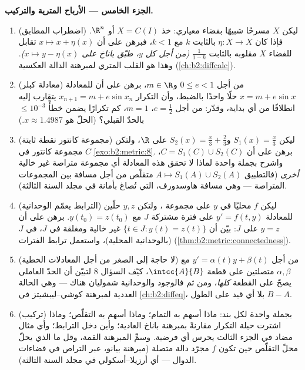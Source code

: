 \begin{problem}
\medskip
\noindent\textbf{الجزء الخامس --- الأرباح المترية والتركيب.}
\begin{enumerate}[resume]
  \item (اضطراب المطابق) ليكن $X$ مسرحًا 
        شبيهًا بفضاء معياري: خذ $X = C(I)$ أو $\R^n$. فإذا كان
        $\eta \colon X \to X$  بالثابت $k$ مع $k < 1$،
        فبرهن على أن $x \mapsto x + \eta(x)$ تقابل للفضاء $X$
        مقلوبه  بالثابت $\frac1{1-k}$ \emph{(من أجل كل
        $y$، طبّق باناخ على $x \mapsto y - \eta(x)$)}. وهذا
        هو القلب المتري لمبرهنة الدالة العكسية
        (\cref{ch:b2:diffcalc}).
  \item (معادلة كبلر) من أجل $0 \leq e < 1$ و$m \in \R$،
        برهن على أن للمعادلة $x = m + e\sin x$ حلًا واحدًا بالضبط،
        وأن التكرار $x_{n+1} = m + e\sin x_n$ يتقارب
        إليه انطلاقًا من أي بداية، وقدّر: من أجل $e = \frac12$،
        $m = 1$، كم تكرارًا يضمن خطأً $\leq
        10^{-3}$ بالحدّ القبلي؟ (الحلّ هو $x
        \approx 1.4987$.)
  \item (مجموعة كانتور نقطة ثابتة) ليكن $S_1(x) = \frac
        x3$ و$S_2(x) = \frac x3 + \frac23$ على $\R$، ولتكن
        $C$ مجموعة كانتور في \cref{exo:b2:metric:8}. برهن على أن
        $C = S_1(C) \cup S_2(C)$، واشرح بجملة واحدة
        لماذا لا تحقق هذه المعادلة أي مجموعة متراصة غير خالية
        \emph{أخرى} (فالتطبيق $A \mapsto S_1(A) \cup S_2(A)$
        متقلّص من أجل مسافة بين المجموعات المتراصة --- وهي
        مسافة هاوسدورف، التي تُصاغ بأمانة في مجلد السنة الثالثة).
  \item (الترابط يعمّم الوحدانية) ليكن $f$  محليًا
        في $y$ على مجموعة ، ولتكن $y, z$ حلّين
        للمعادلة $y' = f(t, y)$ على فترة مشتركة $J$
        مع $y(t_0) = z(t_0)$. برهن على أن $y = z$ على $J$: بيّن أن
        $\{t \in J : y(t) = z(t)\}$ غير خالية ومغلقة في $J$،
         في $J$ (بالوحدانية المحلية)، واستعمل
        ترابط الفترات
        (\cref{thm:b2:metric:connectedness}).
  \item (لا حاجة إلى الصغر من أجل المعادلات الخطية) من أجل $y' =
        \alpha(t)y + \beta(t)$ مع $\alpha, \beta$ متصلتين
        على قطعة $\intcc{A}{B}$، كيّف السؤال 8 لتبيّن أن
        الحدّ العاملي يصحّ على القطعة \emph{كلها}،
        ومن ثم فالوجود والوحدانية شموليان هناك --- وهي
        الحالة العددية لمبرهنة كوشي--ليبشيتز في \cref{ch:b2:diffeq}،
        بلا أي قيد على الطول $B - A$.
  \item (تركيب) بجملة واحدة لكل بند: ماذا أسهم به التمام؛
        وماذا أسهم به التقلّص؛ وماذا اشترت حيلة
        التكرار مقارنةً بمبرهنة باناخ العادية؛ وأين دخل
        الترابط؛ وأي مثال مضاد في الجزء
        الثالث يحرس أي فرضية. وسمِّ المبرهنة القمة،
        وقل ما الذي يحلّ محلّ التقلّص حين تكون $f$ مجرّد
        دالة متصلة (مبرهنة بيانو، عبر التراص في فضاءات
        الدوال --- أي أرزيلا--أسكولي في مجلد السنة الثالثة).
\end{enumerate}
\end{problem}
